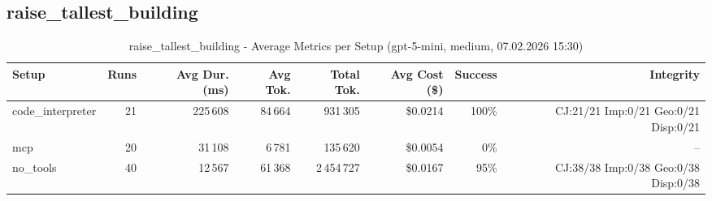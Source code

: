 \documentclass[a4paper,11pt]{article}
\begin{document}
\clearpage

\subsection{raise\_tallest\_building}

\begin{table}[H]
\centering
\scriptsize
\caption{raise\_tallest\_building - Average Metrics per Setup (gpt-5-mini, medium, 07.02.2026 15:30)}
\label{tab:combined\_raise\_tallest\_building\_metrics\_20260207}
\begin{tabular}{l r r r r r r r}
\toprule
Setup & Runs & Avg Dur. (ms) & Avg Tok. & Total Tok. & Avg Cost (\$) & Success & Integrity \\
\midrule
code\_interpreter & 21 & 225\,608 & 84\,664 & 931\,305 & \$0.0214 & 100\% & CJ:21/21 Imp:0/21 Geo:0/21 Disp:0/21 \\
mcp & 20 & 31\,108 & 6\,781 & 135\,620 & \$0.0054 & 0\% & -- \\
no\_tools & 40 & 12\,567 & 61\,368 & 2\,454\,727 & \$0.0167 & 95\% & CJ:38/38 Imp:0/38 Geo:0/38 Disp:0/38 \\
\bottomrule
\end{tabular}
\end{table}
\end{document}
